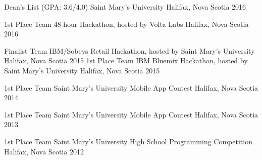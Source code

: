 



\begin{cvhonors}
  \cvhonor
    {Dean's List (GPA: 3.6/4.0)} %
    {Saint Mary's University} %
    {Halifax, Nova Scotia} %
    {2016} %

  \cvhonor
    {1st Place Team} %
    {48-hour Hackathon, hosted by Volta Labs} %
    {Halifax, Nova Scotia} %
    {2016} %

  \cvhonor
    {Finalist Team} %
    {IBM/Sobeys Retail Hackathon, hosted by Saint Mary's University} %
    {Halifax, Nova Scotia} %
    {2015} %
  \cvhonor
    {1st Place Team} %
    {IBM Bluemix Hackathon, hosted by Saint Mary's University} %
    {Halifax, Nova Scotia} %
    {2015} %

  \cvhonor
    {1st Place Team} %
    {Saint Mary's University Mobile App Contest} %
    {Halifax, Nova Scotia} %
    {2014} %

  \cvhonor
    {1st Place Team} %
    {Saint Mary's University Mobile App Contest} %
    {Halifax, Nova Scotia} %
    {2013} %

  \cvhonor
    {1st Place Team} %
    {Saint Mary's University High School Programming Competition} %
    {Halifax, Nova Scotia} %
    {2012} %


\end{cvhonors}
